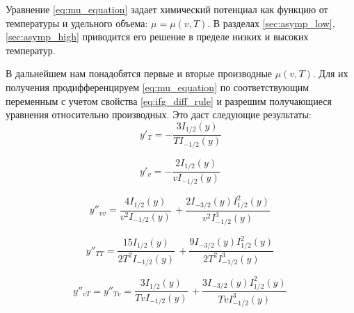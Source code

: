 Уравнение \eqref{eq:mu_equation} задает химический потенциал как функцию от температуры и удельного объема: $\mu = \mu(v, T)$.
В разделах \ref{sec:asymp_low}, \ref{sec:asymp_high} приводится его решение в пределе низких и высоких температур.

В дальнейшем нам понадобятся первые и вторые производные $\mu(v, T)$.
Для их получения продифференцируем \eqref{eq:mu_equation} по соответствующим переменным с учетом свойства \eqref{eq:ifg_diff_rule} и разрешим получающиеся уравнения относительно производных. Это даст следующие результаты:
\begin{equation}
   \label{eq:mu_T}
   y'_{T} = -\frac{3 I_{1 / 2}(y)}{T I_{-1 / 2}(y)}
\end{equation}

\begin{equation}
   \label{eq:mu_v}
   y'_{v} = - \frac{2 I_{1 / 2} (y)}{v I_{-1 / 2} (y)}\,
\end{equation}

\begin{equation}
   \label{eq:mu_vv}
   y''_{vv} = \frac{4 I_{1 / 2} (y)}{v^2 I_{-1 / 2} (y)}\, + \frac{2 I_{-3 /2} (y) I_{1 / 2} ^2 (y)}{v^2 I_{-1 /2}^3 (y)}\,
\end{equation}

\begin{equation}
   \label{eq:mu_TT}
   y''_{TT} = \frac{15 I_{1 /2} (y)}{2 T^2 I_{-1 /2} (y)}\, + \frac{9 I_{-3 /2}(y) I_{1 /2}^2 (y)}{2 T^2 I_{-1 /2}^3 (y)}\,
\end{equation}

\begin{equation}
   \label{eq:mu_vT}
   y''_{vT} = y''_{Tv} = \frac{3 I_{1 /2}(y)}{T v I_{-1 /2} (y)}\, + \frac{3 I_{-3 /2} (y) I_{1 /2}^2 (y)}{T v I_{-1 /2}^3 (y)}\,
\end{equation}

